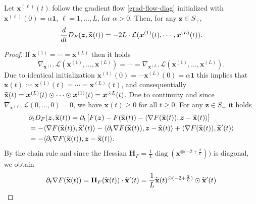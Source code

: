\documentclass{svproc}
\newcommand{\bx}{\boldsymbol{x}}
\newcommand{\bz}{\boldsymbol{z}}
\newcommand{\0}{\boldsymbol{0}}
\newcommand{\1}{\boldsymbol{1}}
\renewcommand{\tilde}{\widetilde}
\def\Ldln{\mathcal{L}_\text{dln}}
\def\xprod{\tilde{\bf x}}
\def\tcont{{t}}
\newcommand{\diag}{\mathrm{diag}}
\begin{document}
\begin{lemma}\label{lemma:Bregman_nonincreasing}
Let $\bx^{(\ell)}(t)$ follow the gradient flow \eqref{grad-flow-diag} initialized with $\bx^{(\ell)}(0) = \alpha\1$, $\ell=1,\hdots,L$, for $\alpha > 0$. Then, for any $\bz\in S_+$, 
\begin{equation}\label{eq:DFderivative}
    \frac{d}{dt} D_F(\bz,\xprod(t))
    =-2L\cdot\mathcal{L}(\bx^{(1)}(t),\cdots,\bx^{(L)}(t)).
\end{equation}
\end{lemma}
\begin{proof}
    If $\bx^{(1)} = \cdots = \bx^{(L)}$ then it holds
    \[
    \nabla_{\bx^{(1)}} \mathcal{L}(\bx^{(1)},\hdots,\bx^{(L)}) = \cdots = \nabla_{\bx^{(L)}} \mathcal{L}(\bx^{(1)},\hdots,\bx^{(L)}).
    \]
    Due to identical initialization $\bx^{(1)}(0) = \cdots \bx^{(L)}(0) = \alpha\1$ this implies that $\bx(t):=\bx^{(1)}(t) = \cdots = \bx^{(L)}(t)$,
     and consequentially $\xprod(t)=\bx^{(L)}(t)\odot\cdots\odot\bx^{(1)}(t)=\bx^{\odot L}(t)$. Due to continuity and since $\nabla_{\bx ^{(\ell)}} \mathcal{L}(0,\hdots,0)  = 0$, we have $\bx(\tcont) \geq 0$ for all $\tcont\geq 0$. For any $\bz\in S_+$ it holds
\begin{align*}
    & \partial_\tcont D_F(\bz,\xprod(\tcont))
    = \partial_\tcont \left[ F(\bz) - F(\xprod(\tcont)) - \langle \nabla F(\xprod(\tcont)), \bz-\xprod(\tcont) \rangle \right]\\
    &= - \langle \nabla F(\xprod(\tcont)), \xprod'(\tcont) \rangle 
    - \langle \partial_\tcont \nabla F(\xprod(\tcont)), \bz-\xprod(\tcont) \rangle
    + \langle \nabla F(\xprod(\tcont)), \xprod'(\tcont) \rangle\\
    &= - \langle \partial_\tcont \nabla F(\xprod(\tcont)), \bz-\xprod(\tcont) \rangle.
\end{align*}
By the chain rule and since the Hessian $\mathbf H_F = \frac{1}{L}\operatorname{\diag}(\bx^{\otimes(-2+\frac{2}{L}}))$ is diagonal, we obtain
\begin{align*}
    & \partial_t \nabla F(\xprod(\tcont))
    = \mathbf H_F (\xprod(\tcont)) \cdot \xprod'(\tcont)
    = \frac{1}{L} \xprod(\tcont)^{\odot(-2+\frac{2}{L})} \odot \xprod'(\tcont)\\

\end{align*}
\end{proof}
\end{document}

